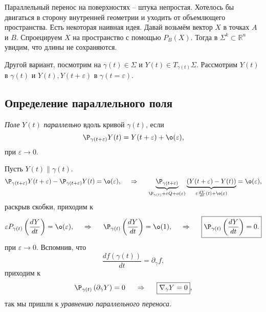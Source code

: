 Параллельный перенос на поверхностях -- штука непростая. Хотелось бы двигаться в сторону внутренней геометрии и уходить от объемлющего пространства. 
Есть некоторая наивная идея. Давай возьмём вектор $X$ в точках $A$ и $B$. Спроецируем $X$ на пространство с помощью $P_B(X)$. Тогда в $\Sigma^k \subset \mathbb{R}^n$ увидим, что длины не сохраняются. 

Другой вариант, посмотрим на $\gamma(t) \in \Sigma$ и $Y(t) \in T_{\gamma(t)} \Sigma$. Рассмотрим $Y(t)$ в $\gamma(t)$ и $Y(t), Y(t+\varepsilon)$ в $\gamma(t=\varepsilon)$. 

\subsection{Определение параллельного поля}


\begin{to_def} 
    \textit{Поле} $Y(t)$ \textit{параллельно} вдоль кривой $\gamma(t)$, если
    \begin{equation*}
        \P_{\gamma(t+\varepsilon)}  Y(t) = 
        Y(t+\varepsilon) + \o(\varepsilon), 
    \end{equation*}
    при $\varepsilon \to 0$. 
\end{to_def}

Пусть $Y(t) \parallel \gamma(t)$.
\begin{equation*}
    \P_{\gamma(t+\varepsilon)} Y(t+\varepsilon) - \P_{\gamma(t+\varepsilon)} Y(t)
    = \o(\varepsilon),
    \hspace{0.5cm} \Rightarrow \hspace{0.5cm} 
    \underbrace{\P_{\gamma(t+\varepsilon)} }_{
    \P_{\gamma(t)} + \varepsilon Q + o(\varepsilon)
    }
    \underbrace{
        \left(
            Y(t+\varepsilon) - Y(t)
        \right) 
    }_{
    \varepsilon \frac{dY}{dt} (t) + \o(\varepsilon)
    }    
    = \o(\varepsilon),
\end{equation*}
раскрыв скобки, приходим к
\begin{equation}
    \varepsilon P_{\gamma(t)} \left(\frac{dY}{dt} \right) = \o(\varepsilon), 
    \hspace{0.5cm} \Rightarrow \hspace{0.5cm}  
    \P_{\gamma(t)} \left(\frac{dY}{dt} \right) = \o(1),
    \hspace{0.5cm} \Rightarrow \hspace{0.5cm} 
    \boxed{
        \P_{\gamma(t)} \left(\frac{dY}{dt} \right) = 0.
    }
\end{equation}
 при $\varepsilon \to 0$.
 Вспомнив, что
 \begin{equation}
     \frac{d f(\gamma(t))}{dt} = \partial_{\dot{\gamma}} f,
 \end{equation}
 приходим к
 \begin{equation}
     \P_{\gamma(t)} \left(
        \partial_{\dot{\gamma}} Y
     \right) = 0
     \hspace{0.5cm} \Rightarrow \hspace{0.5cm} 
     \boxed{
         \nabla_{\dot{\gamma}} Y = 0
     },
 \end{equation}
 так мы пришли к \textit{уравнению параллельного переноса}.

